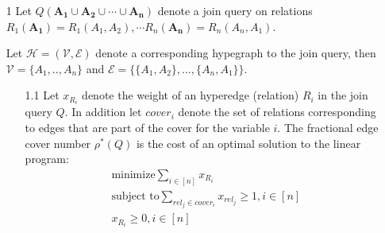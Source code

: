 \documentclass[10pt,a4paper]{article}
\begin{document}
\newtheorem{conjecture}[theorem]{Conjecture}
\begin{enumerate}
\item[1]
Let $Q(\mathbf{A_1} \cup \mathbf{A_2} \cup \cdots \cup \mathbf{A_n})$ denote a join query on relations $R_1(\mathbf{A_1})=R_1(A_1, A_2), \cdots R_n(\mathbf{A_n})=R_n(A_n, A_1)$.

Let $\mathcal{H}=(\mathcal{V}, \mathcal{E})$ denote a corresponding hypegraph to the join query, then $\mathcal{V} = \{A_1, .., A_n\}$ and $\mathcal{E} =\{\{A_1, A_2\}, ..., \{A_n, A_1\}\}$.
\begin{enumerate}
\item[1.1]
Let $x_{R_i}$ denote the weight of an hyperedge (relation) $R_i$ in the join query $Q$. In addition let $cover_i$ denote the set of relations corresponding to edges that are part of the cover for the variable $i$. The fractional edge cover number $\rho^{*}(Q)$ is the cost of an optimal solution to the linear program:
\begin{eqnarray}
\text{minimize} \sum_{i\in [n]} x_{R_i}  \label{eq:minimize} \\
\text{subject to} \sum_{rel_j \in cover_i} x_{rel_j} \geq 1, i \in [n]  \label{eq:inequalities}\\
x_{R_i} \geq 0, i \in [n] \nonumber
\end{eqnarray}


\end{enumerate}
\end{enumerate}
\end{document}
